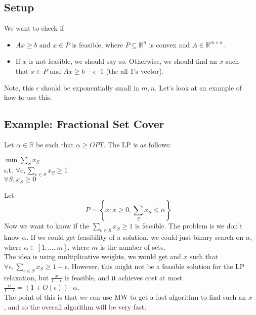 \documentclass[11pt]{article}
\begin{document}
\subsection{Setup}
We want to check if 
\begin{itemize}
\item $Ax\ge b$ and $x\in P$ is feasible, where $P\subseteq \mathbb{R}^n$ is convex and $A\in \mathbb{R}^{m\times n}$.
\item If $x$ is not feasible, we should say so. Otherwise, we should find an $x$ such that $x\in P$ and $Ax\ge b - \epsilon\cdot 1$ (the all 1's vector).
\end{itemize}
Note, this $\epsilon$ should be exponentially small in $m,n$. Let's look at an example of how to use this.
\subsection{Example: Fractional Set Cover}
Let $\alpha\in \mathbb{R}$ be such that $\alpha\ge OPT$. The LP is as follows:
\begin{center}
$\min \displaystyle\sum_S x_S$\\
s.t. $\forall e, \displaystyle\sum_{e\in S} x_S\ge 1$\\
$\forall S, x_S\ge 0$
\end{center}
Let 
\begin{equation}
P = \left\{ x: x\ge 0, \sum_S x_S \le \alpha\right\}
\end{equation}
Now we want to know if the $\displaystyle\sum_{e\in S} x_S\ge 1$ is feasible. The problem is we don't know $\alpha$. If we could get feasibility of a solution, we could just binary search on $\alpha$, where $\alpha\in [1,\ldots, m]$, where $m$ is the number of sets. \medskip\\
The idea is using multiplicative weights, we would get and $x$ such that $\forall e, \displaystyle\sum_{e\in S} x_S\ge 1-\epsilon$. However, this might not be a feasible solution for the LP relaxation, but $\frac{x}{1-\epsilon}$ is feasible, and it achieves cost at most $\frac{\alpha}{1-\epsilon} = (1+O(\epsilon))\cdot \alpha$.\medskip\\
The point of this is that we can use MW to get a fast algorithm to find such an $x$, and so the overall algorithm will be very fast.
\end{document}
